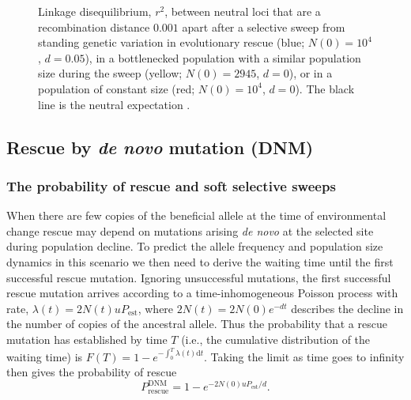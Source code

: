 \documentclass[]{article}
\begin{document}
\begin{figure}[htb]
\begin{tikzpicture}
\end{tikzpicture}
\caption{
Linkage disequilibrium, $r^2$, between neutral loci that are a recombination distance $0.001$ apart after a selective sweep from standing genetic variation in evolutionary rescue (blue; $N(0)=10^4$, $d=0.05$), in a bottlenecked population with a similar population size during the sweep (yellow; $N(0)=2945$, $d=0$), or in a population of constant size (red; $N(0)=10^4$, $d=0$).
The black line is the neutral expectation \citep[equation 7.31 in][]{wakeley2009coalescent}. 
}%
\label{fig:rescueSGV_LD}
\end{figure}

\subsection*{Rescue by \textit{de novo} mutation (DNM)}
\label{sec:rescue_forward_DNM}

\subsubsection*{The probability of rescue and soft selective sweeps}

When there are few copies of the beneficial allele at the time of environmental change rescue may depend on mutations arising \textit{de novo} at the selected site during population decline.
To predict the allele frequency and population size dynamics in this scenario we then need to derive the waiting time until the first successful rescue mutation.
Ignoring unsuccessful mutations, the first successful rescue mutation arrives according to a time-inhomogeneous Poisson process with rate, $\lambda(t) = 2 N(t) u P_\mathrm{est}$, where $2N(t) = 2N(0) e^{-d t}$ describes the decline in the number of copies of the ancestral allele.
Thus the probability that a rescue mutation has established by time $T$ (i.e., the cumulative distribution of the waiting time) is $F(T) = 1-e^{-\int_0^T \lambda(t) \mathrm{d}t}$.
Taking the limit as time goes to infinity then gives the probability of rescue \citep[c.f., equation 10 in][]{orr2008population}
\begin{equation}
P_{\mathrm{rescue}}^{\mathrm{DNM}} = 1 - e^{-2 N(0) u P_\mathrm{est} / d}.
\end{equation}
\end{document}
